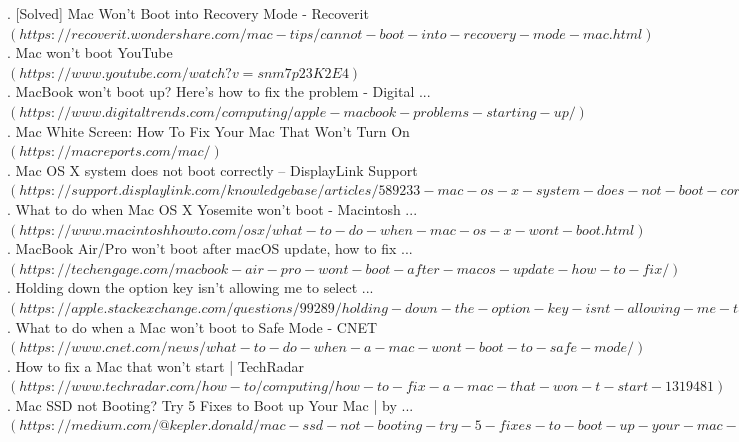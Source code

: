 \documentclass[a4paper]{scrartcl}
\begin{document}
. [Solved] Mac Won't Boot into Recovery Mode - Recoverit\\
\indent \indent $(https://recoverit.wondershare.com/mac-tips/cannot-boot-into-recovery-mode-mac.html)$\\
. Mac won't boot YouTube\\
\indent \indent $(https://www.youtube.com/watch?v=snm7p23K2E4)$\\
. MacBook won't boot up? Here's how to fix the problem - Digital ...\\
\indent \indent $(https://www.digitaltrends.com/computing/apple-macbook-problems-starting-up/)$\\
. Mac White Screen: How To Fix Your Mac That Won’t Turn On\\
\indent \indent $(https://macreports.com/mac/)$\\
. Mac OS X system does not boot correctly – DisplayLink Support\\
\indent \indent $(https://support.displaylink.com/knowledgebase/articles/589233-mac-os-x-system-does-not-boot-correctly)$\\
. What to do when Mac OS X Yosemite won't boot - Macintosh ...\\
\indent \indent $(https://www.macintoshhowto.com/osx/what-to-do-when-mac-os-x-wont-boot.html)$\\
. MacBook Air/Pro won't boot after macOS update, how to fix ...\\
\indent \indent $(https://techengage.com/macbook-air-pro-wont-boot-after-macos-update-how-to-fix/)$\\
. Holding down the option key isn't allowing me to select ...\\
\indent \indent $(https://apple.stackexchange.com/questions/99289/holding-down-the-option-key-isnt-allowing-me-to-select-windows-os-x-on-startup)$\\
. What to do when a Mac won't boot to Safe Mode - CNET\\
\indent \indent $(https://www.cnet.com/news/what-to-do-when-a-mac-wont-boot-to-safe-mode/)$\\
. How to fix a Mac that won't start | TechRadar\\
\indent \indent $(https://www.techradar.com/how-to/computing/how-to-fix-a-mac-that-won-t-start-1319481)$\\
. Mac SSD not Booting? Try 5 Fixes to Boot up Your Mac | by ...\\
\indent \indent $(https://medium.com/@kepler.donald/mac-ssd-not-booting-try-5-fixes-to-boot-up-your-mac-710d02aec288)$\\
\end{document}
